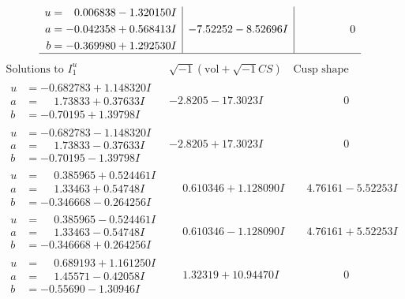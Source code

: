 \documentclass[1p]{elsarticle_modified}
\theoremstyle{definition}
\newcommand{\I}{\sqrt{-1}}
\begin{document}
$$\begin{array}{c|c|c}
\begin{aligned}
u &= \phantom{-}0.006838 - 1.320150 I \\
a &= -0.042358 + 0.568413 I \\
b &= -0.369980 + 1.292530 I\end{aligned}
 & -7.52252 - 8.52696 I & \phantom{-0.000000 } 0\\
 \hline 
 \end{array}$$\newpage$$\begin{array}{c|c|c}  
\text{Solutions to }I^u_{1}& \I (\text{vol} + \sqrt{-1}CS) & \text{Cusp shape}\\
 \hline 
\begin{aligned}
u &= -0.682783 + 1.148320 I \\
a &= \phantom{-}1.73833 + 0.37633 I \\
b &= -0.70195 + 1.39798 I\end{aligned}
 & -2.8205 - 17.3023 I & \phantom{-0.000000 } 0 \\ \hline\begin{aligned}
u &= -0.682783 - 1.148320 I \\
a &= \phantom{-}1.73833 - 0.37633 I \\
b &= -0.70195 - 1.39798 I\end{aligned}
 & -2.8205 + 17.3023 I & \phantom{-0.000000 } 0 \\ \hline\begin{aligned}
u &= \phantom{-}0.385965 + 0.524461 I \\
a &= \phantom{-}1.33463 + 0.54748 I \\
b &= -0.346668 - 0.264256 I\end{aligned}
 & \phantom{-}0.610346 + 1.128090 I & \phantom{-}4.76161 - 5.52253 I \\ \hline\begin{aligned}
u &= \phantom{-}0.385965 - 0.524461 I \\
a &= \phantom{-}1.33463 - 0.54748 I \\
b &= -0.346668 + 0.264256 I\end{aligned}
 & \phantom{-}0.610346 - 1.128090 I & \phantom{-}4.76161 + 5.52253 I \\ \hline\begin{aligned}
u &= \phantom{-}0.689193 + 1.161250 I \\
a &= \phantom{-}1.45571 - 0.42058 I \\
b &= -0.55690 - 1.30946 I\end{aligned}
 & \phantom{-}1.32319 + 10.94470 I & \phantom{-0.000000 } 0 \\ \hline\begin{aligned}

\end{aligned}
\end{array}$$
\end{document}
